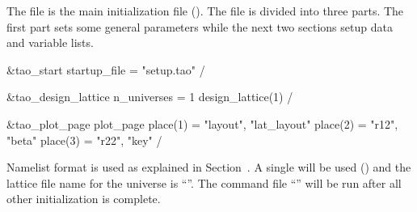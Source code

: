 \documentclass{hitec}     %
\begin{document}
The file  is the main initialization file (). The file is divided
into three parts. The first part sets some general parameters while the next two sections setup data
 and variable  lists.
\begin{code}
&tao_start
  startup_file = "setup.tao"
/

&tao_design_lattice
  n_universes = 1
  design_lattice(1)%
/

&tao_plot_page
  plot_page%
  place(1) = "layout", "lat_layout"
  place(2) = "r12", "beta"
  place(3) = "r22", "key"
/
\end{code}
Namelist format is used as explained in Section~. A single  will be
used () and the lattice file name for the universe is ``''. The
command file ``'' will be run after all other initialization is complete.
\end{document}
